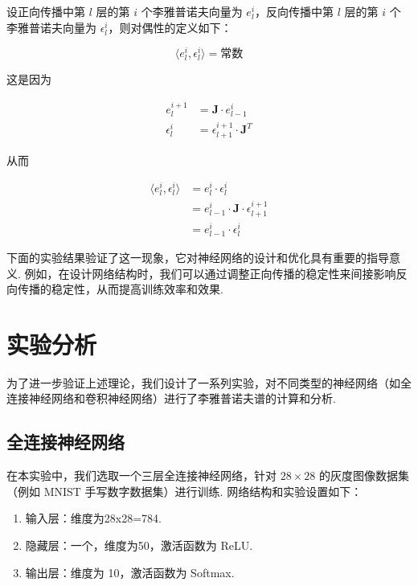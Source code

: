 设正向传播中第 \(l\) 层的第 \(i\) 个李雅普诺夫向量为 \(e_{l}^{i}\)，反向传播中第 \(l\) 层的第 \(i\) 个李雅普诺夫向量为 \(\epsilon_{l}^{i}\)，则对偶性的定义如下：

\[
\langle e_{l}^{i}, \epsilon_{l}^{i} \rangle = \text{常数}
\]

这是因为

\begin{equation}
\begin{aligned}
  e_{l}^{i+1} &= \mathbf{J} \cdot e_{l-1}^{i} \\
  \epsilon_{l}^{i} &= \epsilon_{l+1}^{i+1} \cdot \mathbf{J}^T
\end{aligned}
\end{equation}

从而

\begin{equation}
\begin{aligned}
  \langle e_{l}^{i}, \epsilon_{l}^{i} \rangle &= e_{l}^{i} \cdot \epsilon_{l}^{i} \\
  &= e_{l-1}^{i} \cdot \mathbf{J} \cdot \epsilon_{l+1}^{i+1} \\
  &= e_{l-1}^{i} \cdot \epsilon_{l}^{i}
\end{aligned}
\end{equation}

下面的实验结果验证了这一现象，它对神经网络的设计和优化具有重要的指导意义. 例如，在设计网络结构时，我们可以通过调整正向传播的稳定性来间接影响反向传播的稳定性，从而提高训练效率和效果. 

\section{实验分析}

为了进一步验证上述理论，我们设计了一系列实验，对不同类型的神经网络（如全连接神经网络和卷积神经网络）进行了李雅普诺夫谱的计算和分析. 

\subsection{全连接神经网络}

在本实验中，我们选取一个三层全连接神经网络，针对 $28\times 28$ 的灰度图像数据集（例如 MNIST 手写数字数据集）进行训练. 网络结构和实验设置如下：

\begin{enumerate}
  \item 输入层：维度为28x28=784. 
  \item 隐藏层：一个，维度为50，激活函数为 ReLU. 
  \item 输出层：维度为 10，激活函数为 Softmax. 
\end{enumerate}

